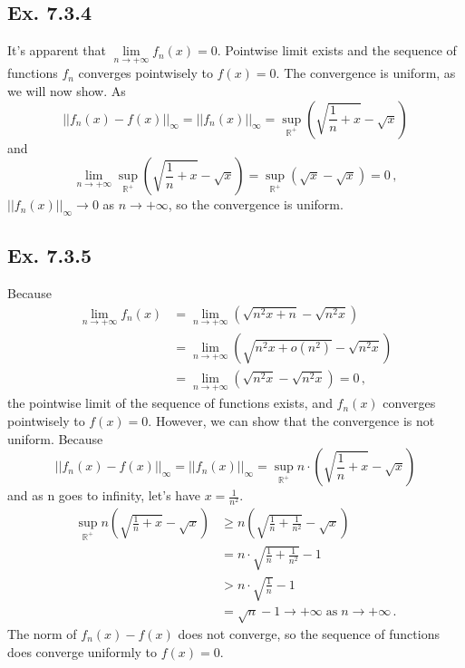 \documentclass[11pt,twoside,a4paper]{article}
\begin{document}
\subsection{Ex. 7.3.4}
It's apparent that $\lim\limits_{n\rightarrow +\infty} f_n (x)=0$. Pointwise limit exists and the sequence of functions $f_n$ converges pointwisely to $f(x)=0$.\newline
The convergence is uniform, as we will now show. As
$$||f_n (x)-f(x)||_{\infty}=||f_n (x)||_{\infty}=\sup\limits_{\mathbb{R}^{+}} (\sqrt{\frac{1}{n}+x}-\sqrt{x})$$and$$\lim\limits_{n\rightarrow +\infty} {\sup\limits_{\mathbb{R}^{+}} (\sqrt{\frac{1}{n}+x}-\sqrt{x})}=\sup\limits_{\mathbb{R}^{+}} (\sqrt{x}-\sqrt{x})=0\, ,$$$||f_n (x)||_{\infty}\rightarrow 0$ as $n\rightarrow +\infty$, so the convergence is uniform.
\subsection{Ex. 7.3.5}
Because
\begin{align*}
\lim\limits_{n\rightarrow +\infty} f_n (x)&=\lim\limits_{n\rightarrow +\infty} (\sqrt{n^2 x+n}-\sqrt{n^2 x})\\&=\lim\limits_{n\rightarrow +\infty} (\sqrt{n^2 x+o(n^2 )}-\sqrt{n^2 x})\\&=\lim\limits_{n\rightarrow +\infty} (\sqrt{n^2 x}-\sqrt{n^2 x})=0\, ,
\end{align*}
the pointwise limit of the sequence of functions exists, and $f_n (x)$ converges pointwisely to $f(x)=0$.\newline
However, we can show that the convergence is not uniform. Because
$$||f_n (x)-f(x)||_{\infty}=||f_n (x)||_{\infty}=\sup\limits_{\mathbb{R}^{+}} n\cdot (\sqrt{\frac{1}{n}+x}-\sqrt{x})$$
and as n goes to infinity, let's have $x=\frac{1}{n^2}$.\newline
\begin{align*}
\sup\limits_{\mathbb{R}^{+}} n(\sqrt{\frac{1}{n}+x}-\sqrt{x}) &\geq n(\sqrt{\frac{1}{n}+\frac{1}{n^2}}-\sqrt{x})\\&=n\cdot\sqrt{\frac{1}{n}+\frac{1}{n^2}}-1\\&>n\cdot\sqrt{\frac{1}{n}}-1\\&=\sqrt{n}-1\rightarrow +\infty\;\text{as}\;n\rightarrow +\infty\, .
\end{align*}
The norm of $f_n (x)-f(x)$ does not converge, so the sequence of functions does converge uniformly to $f(x)=0$.
\end{document}
